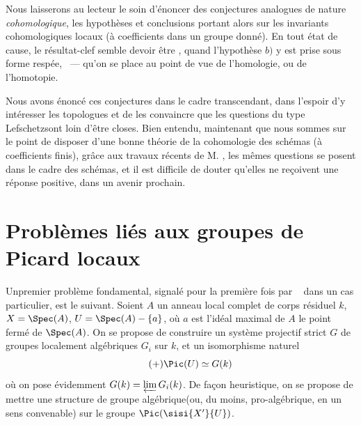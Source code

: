 Nous laisserons au lecteur le soin d'\'enoncer des conjectures analogues de nature \emph{cohomologique}, les hypoth\`eses et conclusions portant alors sur les invariants cohomologiques locaux (\`a coefficients dans un groupe donn\'e). En tout \'etat de cause, le r\'esultat-clef semble devoir \^etre , quand l'hypoth\`ese $b)$ y est prise sous forme resp\'ee, \ --- qu'on se place au point de vue de l'homologie, ou de l'homotopie.

Nous avons \'enonc\'e ces conjectures dans le cadre transcendant, dans
l'espoir d'y int\'eresser les topologues et de les convaincre que
les questions du type \og Lefschetz\fg sont loin d'\^etre closes.
Bien entendu, maintenant que nous sommes sur le point de disposer
d'une bonne th\'eorie de la cohomologie des sch\'emas (\`a coefficients
finis), gr\^ace aux travaux r\'ecents de M. , les
m\^emes questions se posent dans le cadre des sch\'emas, et il est
difficile de douter qu'elles ne re\c coivent une r\'eponse positive,
dans un avenir prochain.

\section{Probl\`emes li\'es aux groupes de Picard locaux} \label{XIII.5}

Un\pageoriginale premier probl\`eme fondamental, signal\'e pour la premi\`ere fois par ~\cite{XIII.5} dans un cas particulier, est le suivant. Soient $A$ un anneau local complet de corps r\'esiduel $k$, $X=\Spec(A)$, $U=\Spec(A)-\{a\}$, o\`u $a$ est l'id\'eal maximal de $A$ \ie le point ferm\'e de $\Spec(A)$. On se propose de construire un syst\`eme projectif strict $G$ de groupes localement alg\'ebriques $G_i$ sur $k$, et un isomorphisme naturel \begin{equation*} \label{eq:XIII.5.+} \tag{$+$} {\Pic(U)\simeq G(k)} \end{equation*} o\`u on pose \'evidemment $G(k)=\varprojlim G_i(k)$. De fa\c con heuristique, on se propose de \og mettre une structure de groupe alg\'ebrique\fg (ou, du moins, pro-alg\'ebrique, en un sens convenable) sur le groupe $\Pic(\sisi{X'}{U})$.

